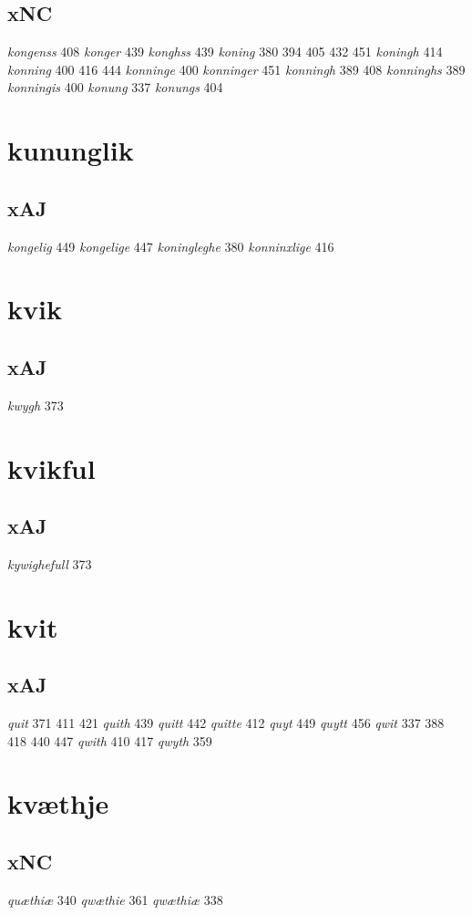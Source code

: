 \documentclass[a4paper,twocolumn]{article}
\begin{document}
\subsection{xNC}
\label{sec:orgd74a273}
\emph{kongenss} 408 \emph{konger} 439 \emph{konghss} 439 \emph{koning} 380 394 405 432 451 \emph{koningh} 414 \emph{konning} 400 416 444 \emph{konninge} 400 \emph{konninger} 451 \emph{konningh} 389 408 \emph{konninghs} 389 \emph{konningis} 400 \emph{konung} 337 \emph{konungs} 404 
\section{kununglik}
\label{sec:orgb1ff21c}
\subsection{xAJ}
\label{sec:org88fcdd7}
\emph{kongelig} 449 \emph{kongelige} 447 \emph{koningleghe} 380 \emph{konninxlige} 416 
\section{kvik}
\label{sec:orgef6dddb}
\subsection{xAJ}
\label{sec:orgeff09f8}
\emph{kwygh} 373 
\section{kvikful}
\label{sec:org3506806}
\subsection{xAJ}
\label{sec:orgb721448}
\emph{kywighefull} 373 
\section{kvit}
\label{sec:org89e33aa}
\subsection{xAJ}
\label{sec:org3593088}
\emph{quit} 371 411 421 \emph{quith} 439 \emph{quitt} 442 \emph{quitte} 412 \emph{quyt} 449 \emph{quytt} 456 \emph{qwit} 337 388 418 440 447 \emph{qwith} 410 417 \emph{qwyth} 359 
\section{kvæthje}
\label{sec:org1d3e73c}
\subsection{xNC}
\label{sec:org0745235}
\emph{quæthiæ} 340 \emph{qwæthie} 361 \emph{qwæthiæ} 338 
\end{document}
